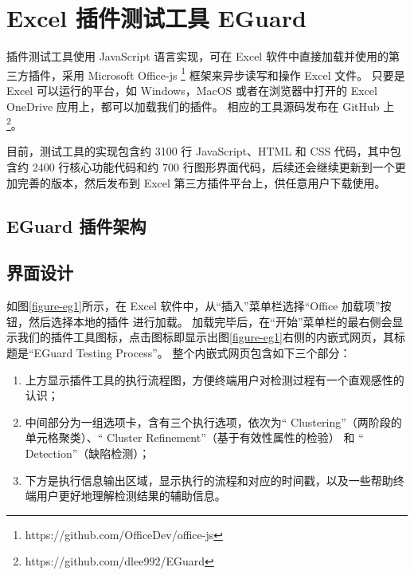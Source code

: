 \section{Excel 插件测试工具 EGuard}
\eg 插件测试工具使用 JavaScript 语言实现，可在 Excel 软件中直接加载并使用的第三方插件，采用 Microsoft Office-js \footnote{https://github.com/OfficeDev/office-js} 框架来异步读写和操作 Excel 文件。
只要是 Excel 可以运行的平台，如 Windows，MacOS 或者在浏览器中打开的 Excel OneDrive 应用上，都可以加载我们的\eg 插件。
相应的工具源码发布在 GitHub 上\footnote{https://github.com/dlee992/EGuard}。

目前，\eg 测试工具的实现包含约 3100 行 JavaScript、HTML 和 CSS 代码，其中包含约 2400 行核心功能代码和约 700 行图形界面代码，后续还会继续更新到一个更加完善的版本，然后发布到 Excel 第三方插件平台上，供任意用户下载使用。

\subsection{EGuard 插件架构}








\subsection{界面设计}
如图\ref{figure-eg1}所示，在 Excel 软件中，从“插入”菜单栏选择“Office 加载项”按钮，然后选择本地的插件 \eg 进行加载。
加载完毕后，在“开始”菜单栏的最右侧会显示我们的插件工具图标，点击图标即显示出图\ref{figure-eg1}右侧的内嵌式网页，其标题是“EGuard Testing Process”。
整个内嵌式网页包含如下三个部分：

\begin{enumerate}
    \item 上方显示\eg 插件工具的执行流程图，方便终端用户对检测过程有一个直观感性的认识；
    \item 中间部分为一组选项卡，含有三个执行选项，依次为“ Clustering”（两阶段的单元格聚类）、“ Cluster Refinement”（基于有效性属性的检验） 和 “ Detection”（缺陷检测）；
    \item 下方是执行信息输出区域，显示执行的流程和对应的时间戳，以及一些帮助终端用户更好地理解检测结果的辅助信息。
\end{enumerate}

